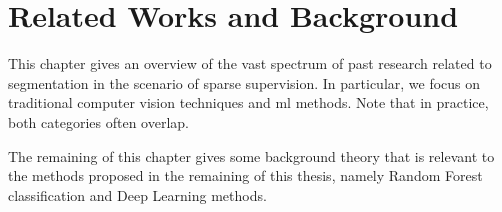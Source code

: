 \chapter{Related Works and Background}

\renewcommand{\thealgsubstate}{\alph{algsubstate}}
\newenvironment{algsubstates}
  {\setcounter{algsubstate}{0}%
   \renewcommand{\State}{%
     \stepcounter{algsubstate}%
     \Statex {\footnotesize\thealgsubstate:}\space}}
  {}

This chapter gives an overview of the vast spectrum of past research related to segmentation in the scenario of sparse supervision.
In particular, we focus on traditional computer vision techniques and
\gls{ml} methods.
Note that in practice, both categories often overlap.

The remaining of this chapter gives some background theory that is relevant to the methods proposed in the remaining of this thesis, namely Random Forest classification and Deep Learning methods.





